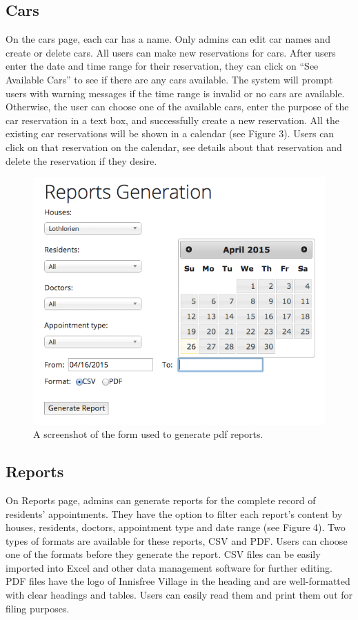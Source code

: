 \documentclass{sig-alternate}
\begin{document}
\subsection{Cars}
On the cars page, each car has a name. Only admins can edit car names and create or delete cars. All users can make new reservations for cars. After users enter the date and time range for their reservation, they can click on “See Available Cars” to see if there are any cars available. The system will prompt users with warning messages if the time range is invalid or no cars are available. Otherwise, the user can choose one of the available cars, enter the purpose of the car reservation in a text box, and successfully create a new reservation. All the existing car reservations will be shown in a calendar (see Figure 3). Users can click on that reservation on the calendar, see details about that reservation and delete the reservation if they desire. 

\begin{figure}
\includegraphics[scale=0.4]{ReportGeneration}
\caption{A screenshot of the form used to generate pdf reports.}
\end{figure}

\subsection{Reports}
On Reports page, admins can generate reports for the complete record of residents' appointments. They have the option to filter each report's content by houses, residents, doctors, appointment type and date range (see Figure 4). Two types of formats are available for these reports, CSV and PDF. Users can choose one of the formats before they generate the report. CSV files can be easily imported into Excel and other data management software for further editing. PDF files have the logo of Innisfree Village in the heading and are well-formatted with clear headings and tables. Users can easily read them and print them out for filing purposes. 
\end{document}
